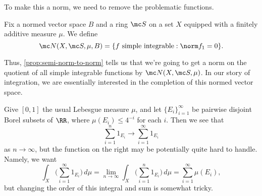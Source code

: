 \documentclass[../notes.tex]{subfiles}
\begin{document}
To make this a norm, we need to remove the problematic functions.
\begin{notation}
	Fix a normed vector space $B$ and a ring $\mc S$ on a set $X$ equipped with a finitely additive measure $\mu$. We define
	\[\mc N(X,\mc S,\mu,B)=\{f\text{ simple integrable}:\norm f_1=0\}.\]
\end{notation}
Thus, \autoref{prop:semi-norm-to-norm} tells us that we're going to get a norm on the quotient of all simple integrable functions by $\mc N(X,\mc S,\mu)$. In our story of integration, we are essentially interested in the completion of this normed vector space.
\begin{example}
	Give $[0,1]$ the usual Lebesgue measure $\mu$, and let $\{E_i\}_{i=1}^\infty$ be pairwise disjoint Borel subsets of $\RR$, where $\mu(E_i)\le 4^{-i}$ for each $i$. Then we see that
	\[\sum_{i=1}^n1_{E_i}\to\sum_{i=1}^\infty1_{E_i}\]
	as $n\to\infty$, but the function on the right may be potentially quite hard to handle. Namely, we want
	\[\int_X\Bigg(\sum_{i=1}^\infty1_{E_i}\Bigg)\,d\mu=\lim_{n\to\infty}\int_X\Bigg(\sum_{i=1}^n1_{E_i}\Bigg)\,d\mu=\sum_{i=1}^\infty\mu(E_i),\]
	but changing the order of this integral and sum is somewhat tricky.
\end{example}
\end{document}
